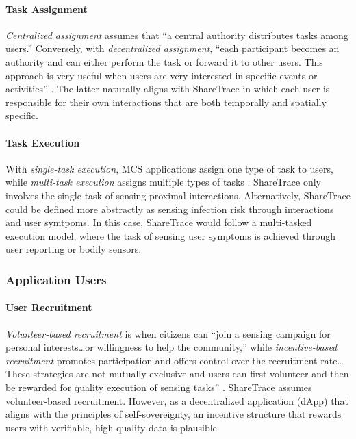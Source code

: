 \paragraph{Task Assignment}

\emph{Centralized assignment} assumes that ``a central authority distributes tasks among users.'' Conversely, with \emph{decentralized assignment}, ``each participant becomes an authority and can either perform the task or forward it to other users. This approach is very useful when users are very interested in specific events or activities'' \cite{Capponi2019}. The latter naturally aligns with ShareTrace in which each user is responsible for their own interactions that are both temporally and spatially specific.

\paragraph{Task Execution}

With \emph{single-task execution}, MCS applications assign one type of task to users, while \emph{multi-task execution} assigns multiple types of tasks \cite{Capponi2019}. ShareTrace only involves the single task of sensing proximal interactions. Alternatively, ShareTrace could be defined more abstractly as sensing infection risk through interactions and user symtpoms. In this case, ShareTrace would follow a multi-tasked execution model, where the task of sensing user symptoms is achieved through user reporting or bodily sensors.

\subsubsection{Application Users}

\paragraph{User Recruitment}

\emph{Volunteer-based recruitment} is when citizens can ``join a sensing campaign for personal interests{\ldots}or willingness to help the community,'' while \emph{incentive-based recruitment} promotes participation and offers control over the recruitment rate{\ldots}These strategies are not mutually exclusive and users can first volunteer and then be rewarded for quality execution of sensing tasks'' \cite{Capponi2019}. ShareTrace assumes volunteer-based recruitment. However, as a decentralized application (dApp) that aligns with the principles of self-sovereignty, an incentive structure that rewards users with verifiable, high-quality data is plausible.

